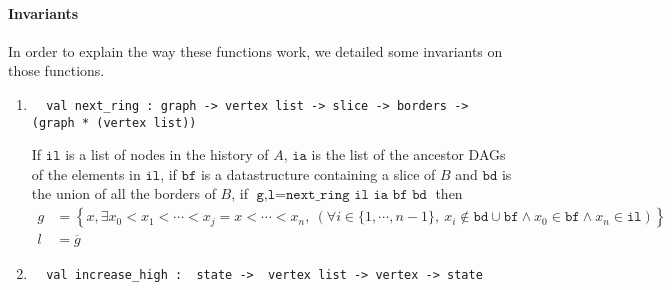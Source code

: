 \paragraph{Invariants} In order to explain the way these functions work, we detailed some invariants on those functions.
\begin{enumerate}
 \item \label{itm:first} 
 \begin{lstlisting}
  val next_ring : graph -> vertex list -> slice -> borders -> (graph * (vertex list))
 \end{lstlisting}
 If $\texttt{il}$ is a list of nodes in the history of $A$, $\texttt{ia}$ is the list of the ancestor DAGs of the elements in $\texttt{il}$, if $\texttt{bf}$ is a datastructure containing a slice of $B$ and $\texttt{bd}$ is the union of all the borders of $B$, if $\texttt{g,l} = \texttt{next\_ring il ia bf bd}$ then 
 \begin{align*}
  g &= \left \{ x , \exists x_0 < x_1 < \cdots <x_j = x <\cdots< x_n ,\ (\forall i \in \{1,\cdots,n-1\},\ x_i \notin \texttt{bd}\cup\texttt{bf} \wedge x_0 \in \texttt{bf} \wedge x_n \in \texttt{il}) \right \}\\
  l &= \overline{g}
 \end{align*}

 \item 
 \begin{lstlisting}
  val increase_high :  state ->  vertex list -> vertex -> state
 \end{lstlisting}


\end{enumerate}

